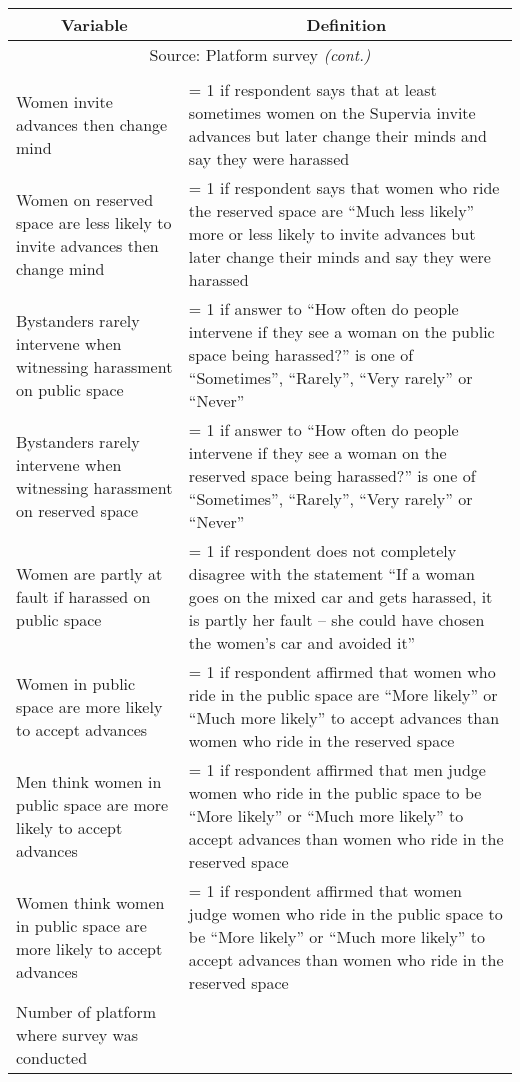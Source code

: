 \begin{table}[H]
    \centering
    \singlespacing
    \footnotesize
    \begin{tabular}{p{.4\linewidth}p{.6\linewidth}}
    \hline\hline 
          \multicolumn{1}{c}{\textbf{Variable}}	&	\multicolumn{1}{c}{\textbf{Definition}}	\\ 
   \hline 
    \multicolumn{2}{c}{Source: Platform survey \textit{(cont.)}} \\
    \hline\\[-1.8ex]
Women invite advances then change mind & = 1 if respondent says that at least sometimes women on the Supervia invite advances but later change their minds and say they were harassed		\\
Women on reserved space are less likely to invite advances then change mind & = 1 if respondent says that women who ride the reserved space are ``Much less likely'' more or less likely to invite advances but later change their minds and say they were harassed \\
Bystanders rarely intervene when witnessing harassment on public space & = 1 if answer to ``How often do people intervene if they see a woman on the public space being harassed?'' is one of ``Sometimes'', ``Rarely'', ``Very rarely'' or ``Never''		\\
Bystanders rarely intervene when witnessing harassment on reserved space & = 1 if answer to ``How often do people intervene if they see a woman on the reserved space being harassed?'' is one of ``Sometimes'', ``Rarely'', ``Very rarely'' or ``Never'' \\
Women are partly at fault if harassed on public space & = 1 if respondent does not completely disagree with the statement ``If a woman goes on the mixed car and gets harassed, it is partly her fault – she could have chosen the women’s car and avoided it''		\\
Women in public space are more likely to accept advances & = 1 if respondent affirmed that women who ride in the public space are ``More likely'' or ``Much more likely'' to accept advances than women who ride in the reserved space	\\
Men think women in public space are more likely to accept advances & = 1 if respondent affirmed that men judge women who ride in the public space to be ``More likely'' or ``Much more likely'' to accept advances than women who ride in the reserved space	\\
Women think women in public space are more likely to accept advances & = 1 if respondent affirmed that women judge women who ride in the public space to be ``More likely'' or ``Much more likely'' to accept advances than women who ride in the reserved space		\\
Number of platform where survey was conducted &		\\
    \hline\hline
    \end{tabular}
\end{table}